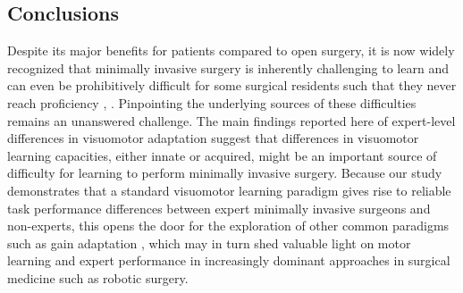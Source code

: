 \documentclass[jou, 11pt, longtable, floatsintext, notab]{apa6}
\begin{document}
\subsection{Conclusions}
Despite its major benefits for patients compared to open
surgery, it is now widely recognized that minimally invasive
surgery is inherently challenging to learn and can even be
prohibitively difficult for some surgical residents such
that they never reach proficiency
\cite{green_action_2003}, \cite{buckley_impact_2014}.
Pinpointing the underlying sources of these difficulties
remains an unanswered challenge. The main findings reported
here of expert-level differences in visuomotor adaptation
suggest that differences in visuomotor learning capacities,
either innate or acquired, might be an important source of
difficulty for learning to perform minimally invasive
surgery. Because our study demonstrates that a standard
visuomotor learning paradigm gives rise to reliable task
performance differences between expert minimally invasive
surgeons and non-experts, this opens the door for the
exploration of other common paradigms such as gain
adaptation \cite{krakauer_learning_2000}, which may in turn
shed valuable light on motor learning and expert performance
in increasingly dominant approaches in surgical medicine
such as robotic surgery.

\printbibliography
\end{document}
